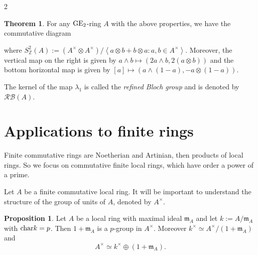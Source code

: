 \documentclass[a0]{sciposter}
\theoremstyle{definition}
\newcommand{\z}{\mathbb{Z}}
\newcommand{\RP}{\mathcal{RP}}
\newcommand{\mmm}{\mathfrak{m}}
\renewcommand{\aa}{{A^\times}}
\newcommand{\GE}{{\rm GE}}
\renewcommand{\char}{{\rm char}}
\newtheorem{theorem}{Theorem}[]
\newtheorem{proposition}{Proposition}[]
\begin{document}
\begin{multicols}{2}
\begin{theorem}
For any $\GE_2$-ring $A$ with the above properties, we have the commutative diagram
  \begin{center}
\end{center}
where $S_{\mathbb{Z}}^2(A):=\left(A^{\times} \otimes A^{\times}\right) /\left\langle a \otimes b+b \otimes a: a, b \in A^{\times}\right\rangle$. Moreover, the vertical map on the right is given by $a \wedge b \mapsto(2 a \wedge b, 2(a \otimes b))$ and the bottom horizontal map is given by $[a] \mapsto(a \wedge(1-a),-a \otimes(1-a))$. 
\end{theorem}
The kernel of the map $\lambda_1$ is called the \textit{refined Bloch group} and is denoted by $\mathcal{RB} (A)$.











\section{Applications to finite rings}


Finite commutative rings are Noetherian and Artinian, then products of local rings. So we focus on commutative finite local rings, which have order a power of a prime.

Let $A$ be a finite commutative local ring. It will be important to understand 
the structure of the group of units of $A$, denoted by $A^\times$. 

\begin{proposition}
Let $A$ be a local ring with maximal ideal $\mmm_A$ and let $k:=A/\mmm_A$ with $\char k =p$. Then $1+\mmm_A$ is a $p$-group in $A^\times$. Moreover $k^\times \simeq  \aa / (1+\mmm_A)$ and
\[
\aa \simeq k^\times \oplus (1+\mmm_A).
\]
\end{proposition}


\end{multicols}
\end{document}
